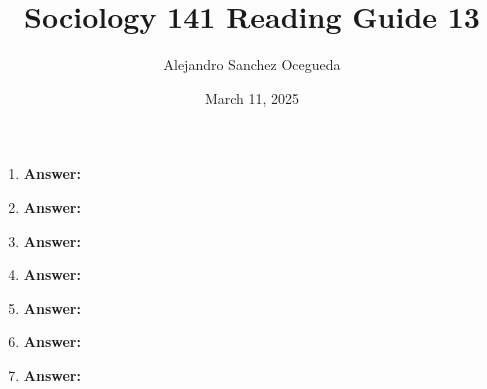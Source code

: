 \documentclass{article}
\title{Sociology 141 Reading Guide 13}
\author{Alejandro Sanchez Ocegueda}
\date{March 11, 2025}
\newcommand{\answer}{\textbf{Answer:}$\;$}
\begin{document}
\maketitle

\begin{enumerate}[label=\arabic*)]
    \item 
    
    \answer 
    
    \item 
    
    \answer 
    
    
    \item 
   

    \answer
    
    \item 
    
    \answer 
    
    \item 
    
    \answer
    

    \item 
    
    \answer
    
    \item 
    
    \answer
    
\end{enumerate}
 
\end{document}
